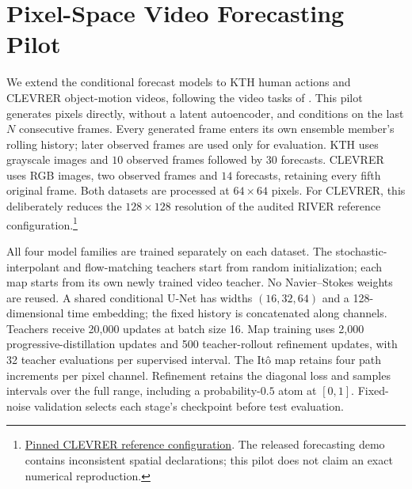 \section{Pixel-Space Video Forecasting Pilot}\label{app:video-case}
We extend the conditional forecast models to KTH human actions and CLEVRER object-motion videos, following the video tasks of \citet{chen2024forecasting}. This pilot generates pixels directly, without a latent autoencoder, and conditions on the last $N$ consecutive frames. Every generated frame enters its own ensemble member's rolling history; later observed frames are used only for evaluation. KTH uses grayscale images and $10$ observed frames followed by $30$ forecasts. CLEVRER uses RGB images, two observed frames and $14$ forecasts, retaining every fifth original frame. Both datasets are processed at $64\times64$ pixels. For CLEVRER, this deliberately reduces the $128\times128$ resolution of the audited RIVER reference configuration.\footnote{\href{https://github.com/Araachie/river/blob/9ecde339e4c19713485fc1ab31bcb524d6772f6e/configs/clevrer.yaml}{Pinned CLEVRER reference configuration}. The released forecasting demo contains inconsistent spatial declarations; this pilot does not claim an exact numerical reproduction.}

\begin{table}[t]
\centering
\small

\caption{Pixel-video setup. $N$ is observed history length and $L$ is the number of future frames; stride counts original video frames. Counts are annotated segments for KTH and videos for CLEVRER. KTH uses subjects 1--18 for training, 19--20 for validation, and 21--25 for testing. CLEVRER retains its official splits. Each dataset has 128 frozen, sufficiently long test cases and four completions per case.}
\label{tab:video-setup}
\end{table}

All four model families are trained separately on each dataset. The stochastic-interpolant and flow-matching teachers start from random initialization; each map starts from its own newly trained video teacher. No Navier--Stokes weights are reused. A shared conditional U-Net has widths $(16,32,64)$ and a 128-dimensional time embedding; the fixed history is concatenated along channels. Teachers receive 20,000 updates at batch size 16. Map training uses 2,000 progressive-distillation updates and 500 teacher-rollout refinement updates, with 32 teacher evaluations per supervised interval. The It\^o map retains four path increments per pixel channel. Refinement retains the diagonal loss and samples intervals over the full range, including a probability-$0.5$ atom at $[0,1]$. Fixed-noise validation selects each stage's checkpoint before test evaluation.

